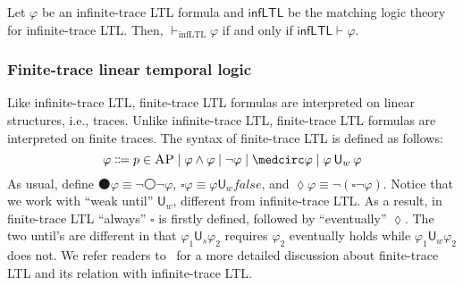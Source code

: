 \documentclass[acmsmall,review,anonymous]{acmart}
\newcommand{\MLinfLTL}{\mathsf{infLTL}}
\newcommand{\infLTL}{\mathrm{infLTL}}
\newcommand{\AP}{\textsc{AP}}
\newcommand{\false}{\mathit{false}}
\newcommand{\wnext}{{\medcirc}}
\newcommand{\snext}{{\medbullet}}
\newcommand{\always}{{\square}}
\newcommand{\eventually}{{\lozenge}}
\newcommand{\Us}{\mathbin{\mathsf{U}_s}}
\newcommand{\Uw}{\mathbin{\mathsf{U}_w}}
\begin{document}
\begin{theorem}
Let $\varphi$ be an infinite-trace LTL formula and $\MLinfLTL$ be the matching
logic theory for infinite-trace LTL.
Then,
$\vdash_\infLTL \varphi$ if and only if
$\MLinfLTL \vdash \varphi$.
\label{thm_csrvext_infLTL}
\end{theorem}

\subsubsection{Finite-trace linear temporal logic}
Like infinite-trace LTL,
finite-trace LTL formulas are interpreted on linear structures, i.e., traces.
Unlike infinite-trace LTL, finite-trace LTL formulas
are interpreted on finite traces.
The syntax of finite-trace LTL is defined as follows:
$$
\varphi \Coloneqq
p \in \AP \mid
\varphi \wedge \varphi \mid
\neg \varphi \mid
\wnext \varphi \mid
\varphi \Uw \varphi
$$
As usual,
define $\snext \varphi \equiv \neg \wnext \neg \varphi$,
$\always \varphi \equiv \varphi \Uw \false$, and
$\eventually \varphi \equiv \neg (\always \neg \varphi)$.
Notice that we work with ``weak until'' $\Uw$, different from infinite-trace LTL.
As a result, in finite-trace LTL ``always'' $\always$ is firstly defined,
followed by ``eventually'' $\eventually$.
The two until's are different in that
$\varphi_1 \Us \varphi_2$ requires $\varphi_2$ eventually holds while
$\varphi_1 \Uw \varphi_2$ does not.
We refer readers to~\cite{bibid} for a more detailed discussion about
finite-trace LTL and its relation with infinite-trace LTL.
\end{document}
